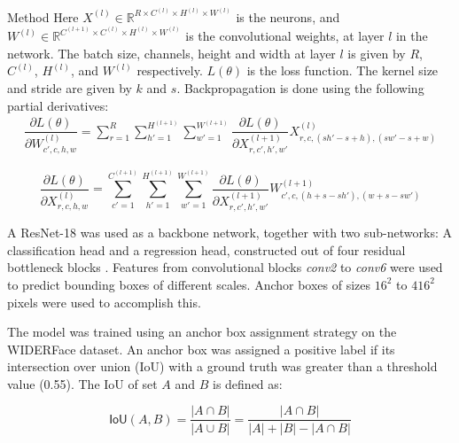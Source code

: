 \documentclass[paperwidth=24in,paperheight=48in, fontscale=0.4166666666666]{baposter}
\newcommand*{\pd}[2]{\ensuremath{\dfrac{\partial #1}{\partial #2}}}
\begin{document}
\begin{poster}
\begin{posterbox}[name=method,column=0,below=background]{Method}
Here $X^{(l)} \in \mathbb{R}^{R \times C^{(l)} \times H^{(l)} \times W^{(l)}}$ is the neurons, and $W^{(l)} \in \mathbb{R}^{C^{(l+1)} \times C^{(l)} \times H^{(l)} \times W^{(l)}}$ is the convolutional weights, at layer $l$ in the network. The batch size, channels, height and width at layer $l$ is given by $R$, $C^{(l)}$, $H^{(l)}$, and $W^{(l)}$ respectively. $L(\theta)$ is the loss function. The kernel size and stride are given by $k$ and $s$. Backpropagation is done using the following partial derivatives:
\begin{align}
	\pd{L(\theta)}{W^{(l)}_{c',c,h,w}} = \sum^{R }_{r=1} \sum^{H^{(l+1)} }_{h'=1} \sum^{W^{(l+1)} }_{w'=1} \pd{L(\theta)}{X^{(l+1)}_{r,c',h',w'}} X^{(l)}_{r, c, (sh'-s+h), (sw'-s+w)}
\end{align}

\begin{equation}
	\pd{L(\theta)}{X^{(l)}_{r,c,h,w}} = \sum^{C^{(l+1)} }_{c'=1} \sum^{H^{(l+1)} }_{h'=1} \sum^{W^{(l+1)} }_{w'=1} \pd{L(\theta)}{X^{(l+1)}_{r,c',h',w'}} W^{(l+1)}_{c', c, (h+s-sh'), (w+s-sw')}
\end{equation}

A ResNet-18 \cite{resnet} was used as a backbone network, together with two sub-networks: A classification head and a regression head, constructed out of four residual bottleneck blocks \cite{resnet}. Features from convolutional blocks \textit{conv2} to \textit{conv6} were used to predict bounding boxes of different scales. Anchor boxes of sizes $16^2$ to $416^2$ pixels were used to accomplish this.
\vspace{10pt}

The model was trained using an anchor box assignment strategy on the WIDERFace \cite{WIDERFace} dataset. An anchor box was assigned a positive label if its intersection over union (IoU) with a ground truth was greater than a threshold value (0.55). The IoU of set $A$ and $B$ is defined as:

\begin{equation}\label{eqiou}
\textsf{IoU}(A, B)=\frac{|A \cap B|}{|A \cup B|} = \frac{|A \cap B|}{|A| + |B| - |A \cap B|}
\end{equation}


\end{posterbox}
\end{poster}
\end{document}
